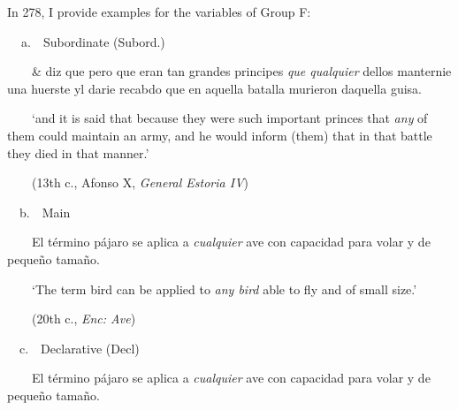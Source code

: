 \begin{styleStandard}
In 278, I provide examples for the variables of Group F:
\end{styleStandard}

\begin{styleStandard}
\textbf{\ \ }a.\ \ Subordinate (Subord.)
\end{styleStandard}

\begin{styleStandard}
\ \ \ \ \& diz que pero que eran tan grandes principes \textit{que qualquier} dellos manternie una huerste yl darie recabdo que en aquella batalla murieron daquella guisa. 
\end{styleStandard}

\begin{styleStandard}
\ \ \ \ ‘and it is said that because they were such important princes that \textit{any} of them could maintain an army, and he would inform (them) that in that battle they died in that manner.’
\end{styleStandard}

\begin{styleStandard}
\ \ \ \ (13th c., Afonso X, \textit{General Estoria IV})
\end{styleStandard}

\begin{styleStandard}
\ \ b.\ \ Main
\end{styleStandard}

\begin{styleStandard}
\ \ \ \ El término pájaro se aplica a \textit{cualquier} ave con capacidad para volar y de pequeño tamaño. 
\end{styleStandard}

\begin{styleStandard}
\ \ \ \ ‘The term bird can be applied to \textit{any bird} able to fly and of small size.’
\end{styleStandard}

\begin{styleStandard}
\ \ \ \ (20th c., \textit{Enc: Ave})
\end{styleStandard}

\begin{styleStandard}
\ \ c.\ \ Declarative (Decl)
\end{styleStandard}

\begin{styleStandard}
\ \ \ \ El término pájaro se aplica a \textit{cualquier} ave con capacidad para volar y de pequeño tamaño. 
\end{styleStandard}

